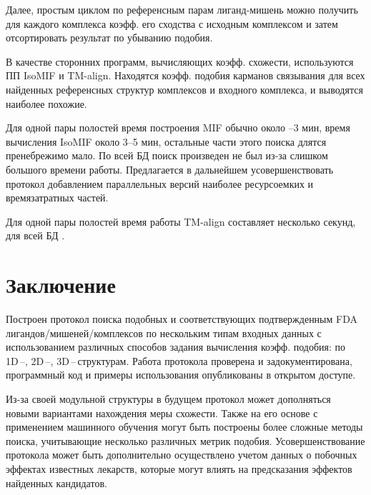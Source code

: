 \documentclass[a4paper,14pt]{article}         %
\newcommand{\sic}[1]{\LARGE\color{orange}{#1}\color{black}\Large}
\begin{document}
Далее, простым циклом по референсным парам лиганд-мишень можно получить для каждого комплекса коэфф. его сходства с исходным комплексом и затем отсортировать результат по убыванию подобия.

В качестве сторонних программ, вычисляющих коэфф. схожести, используются ПП IsoMIF и TM-align. Находятся коэфф. подобия карманов связывания для всех найденных референсных структур комплексов и входного комплекса, и выводятся наиболее похожие.

\sic{ПРИМЕР}

Для одной пары полостей время построения MIF обычно около --3 мин, время вычисления IsoMIF около 3--5 мин, остальные части этого поиска длятся пренебрежимо мало. По всей БД поиск произведен не был из-за слишком большого времени работы. Предлагается в дальнейшем усовершенствовать протокол добавлением параллельных версий наиболее ресурсоемких и времязатратных частей.

Для одной пары полостей время работы TM-align составляет несколько секунд, для всей БД \sic{Сколько}.

\newpage
\section{Заключение}
Построен протокол поиска подобных и соответствующих подтвержденным FDA лигандов/мишеней/комплексов по нескольким типам входных данных с использованием различных способов задания вычисления коэфф. подобия: по 1D\,--, 2D\,--, 3D\,--\,структурам. Работа протокола проверена и задокументирована, программный код и примеры использования опубликованы в открытом доступе.

Из-за своей модульной структуры в будущем протокол может дополняться новыми вариантами нахождения меры схожести. Также на его основе с применением машинного обучения могут быть построены более сложные методы поиска, учитывающие несколько различных метрик подобия. Усовершенствование протокола может быть дополнительно осуществлено учетом данных о побочных эффектах известных лекарств, которые могут влиять на предсказания эффектов найденных кандидатов.


\newpage
\printbibliography[heading=bibintoc, title=Список использованных источников]
\end{document}

